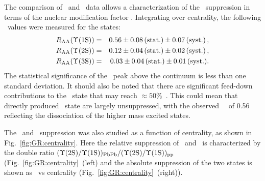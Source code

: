 The comparison of \pp\ and \PbPb\ data allows a characterization of the \PgU\ suppression
in terms of the nuclear modification factor \Raa.
Integrating over centrality, the following \Raa\ values were measured for the \PgUn states:
\begin{eqnarray}
R_\mathrm{AA} (\Upsilon\mathrm{(1S)}) &=& 0.56 \pm 0.08\,\mbox{(stat.)} \pm 0.07\,\mbox{(syst.)} \,, \\
R_\mathrm{AA} (\Upsilon\mathrm{(2S)}) &=& 0.12 \pm 0.04\,\mbox{(stat.)} \pm 0.02\,\mbox{(syst.)} \,, \nonumber \\
R_\mathrm{AA} (\Upsilon\mathrm{(3S)}) &=& 0.03 \pm 0.04\,\mbox{(stat.)} \pm 0.01\,\mbox{(syst.)} .  \nonumber
\end{eqnarray}
The statistical significance of the \PgUc\ peak above the continuum is less than one standard deviation.
It should also be noted that there are significant feed-down contributions to
the \PgUa\ state that may reach $\approx 50\%$~\cite{Affolder:1999wm, Aaij:2012se}.
This could mean that directly produced \PgUa\ state are largely unsuppressed, with
the observed \PgUa\ \Raa\ of 0.56 reflecting the dissociation of the higher mass excited states.

The \PgUa\ and \PgUb\ suppression was also studied as a function of centrality,
as shown in Fig.~\ref{fig:GR:centrality}.
Here the relative suppression of \PgUa\ and \PgUb\ is characterized by
the double ratio \linebreak $({\Upsilon\mathrm{(2S)}/\Upsilon\mathrm{(1S)}})_{\rm PbPb}/({\Upsilon\mathrm{(2S)}/\Upsilon\mathrm{(1S)}})_{\rm pp}$
(Fig.~\ref{fig:GR:centrality}~(left) and the absolute suppression
of the two states is shown as \Raa\ vs centrality (Fig.~\ref{fig:GR:centrality}~(right)).

